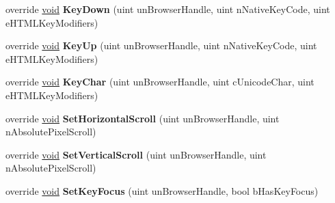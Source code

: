 \begin{DoxyCompactItemize}
\item 
\hypertarget{classValve_1_1Steamworks_1_1CSteamHTMLSurface_a1a4423aefdb6e4657b87110e349d4133}{}override \hyperlink{SDL__audio_8h_a52835ae37c4bb905b903cbaf5d04b05f}{void} {\bfseries Key\+Down} (uint un\+Browser\+Handle, uint n\+Native\+Key\+Code, uint e\+H\+T\+M\+L\+Key\+Modifiers)\label{classValve_1_1Steamworks_1_1CSteamHTMLSurface_a1a4423aefdb6e4657b87110e349d4133}

\item 
\hypertarget{classValve_1_1Steamworks_1_1CSteamHTMLSurface_a53cd29380735a98c7110fca0ca2078bb}{}override \hyperlink{SDL__audio_8h_a52835ae37c4bb905b903cbaf5d04b05f}{void} {\bfseries Key\+Up} (uint un\+Browser\+Handle, uint n\+Native\+Key\+Code, uint e\+H\+T\+M\+L\+Key\+Modifiers)\label{classValve_1_1Steamworks_1_1CSteamHTMLSurface_a53cd29380735a98c7110fca0ca2078bb}

\item 
\hypertarget{classValve_1_1Steamworks_1_1CSteamHTMLSurface_ad5b36d0f3dab39e2015270980b85fb48}{}override \hyperlink{SDL__audio_8h_a52835ae37c4bb905b903cbaf5d04b05f}{void} {\bfseries Key\+Char} (uint un\+Browser\+Handle, uint c\+Unicode\+Char, uint e\+H\+T\+M\+L\+Key\+Modifiers)\label{classValve_1_1Steamworks_1_1CSteamHTMLSurface_ad5b36d0f3dab39e2015270980b85fb48}

\item 
\hypertarget{classValve_1_1Steamworks_1_1CSteamHTMLSurface_a2fd2c6c71f4ab1841bbdc4888ccf9af4}{}override \hyperlink{SDL__audio_8h_a52835ae37c4bb905b903cbaf5d04b05f}{void} {\bfseries Set\+Horizontal\+Scroll} (uint un\+Browser\+Handle, uint n\+Absolute\+Pixel\+Scroll)\label{classValve_1_1Steamworks_1_1CSteamHTMLSurface_a2fd2c6c71f4ab1841bbdc4888ccf9af4}

\item 
\hypertarget{classValve_1_1Steamworks_1_1CSteamHTMLSurface_a9ac75426b021e5891bade7a05342b525}{}override \hyperlink{SDL__audio_8h_a52835ae37c4bb905b903cbaf5d04b05f}{void} {\bfseries Set\+Vertical\+Scroll} (uint un\+Browser\+Handle, uint n\+Absolute\+Pixel\+Scroll)\label{classValve_1_1Steamworks_1_1CSteamHTMLSurface_a9ac75426b021e5891bade7a05342b525}

\item 
\hypertarget{classValve_1_1Steamworks_1_1CSteamHTMLSurface_a7feb91252861df745c9db98c465cb85d}{}override \hyperlink{SDL__audio_8h_a52835ae37c4bb905b903cbaf5d04b05f}{void} {\bfseries Set\+Key\+Focus} (uint un\+Browser\+Handle, bool b\+Has\+Key\+Focus)\label{classValve_1_1Steamworks_1_1CSteamHTMLSurface_a7feb91252861df745c9db98c465cb85d}


\end{DoxyCompactItemize}
